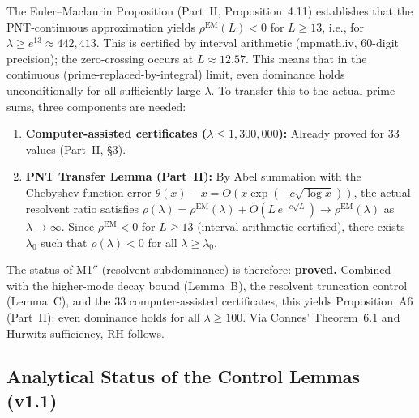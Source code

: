 \documentclass[12pt,a4paper]{article}
\theoremstyle{definition}
\theoremstyle{remark}
\begin{document}
The Euler--Maclaurin Proposition (Part~II, Proposition~4.11) establishes that the PNT-continuous approximation yields $\rho^{\mathrm{EM}}(L) < 0$ for $L \geq 13$, i.e., for $\lambda \geq e^{13} \approx 442{,}413$. This is certified by interval arithmetic (mpmath.iv, 60-digit precision); the zero-crossing occurs at $L \approx 12.57$. This means that in the continuous (prime-replaced-by-integral) limit, even dominance holds unconditionally for all sufficiently large $\lambda$. To transfer this to the actual prime sums, three components are needed:

\begin{enumerate}
  \item \textbf{Computer-assisted certificates ($\lambda \leq 1{,}300{,}000$):} Already proved for $33$ values (Part~II, \S3).
  \item \textbf{PNT Transfer Lemma (Part~II):} By Abel summation with the Chebyshev function error $\theta(x) - x = O(x\exp(-c\sqrt{\log x}))$, the actual resolvent ratio satisfies $\rho(\lambda) = \rho^{\mathrm{EM}}(\lambda) + O(L\,e^{-c\sqrt{L}}) \to \rho^{\mathrm{EM}}(\lambda)$ as $\lambda \to \infty$. Since $\rho^{\mathrm{EM}} < 0$ for $L \geq 13$ (interval-arithmetic certified), there exists $\lambda_0$ such that $\rho(\lambda) < 0$ for all $\lambda \geq \lambda_0$.
\end{enumerate}

\noindent The status of M1$''$ (resolvent subdominance) is therefore: \textbf{proved.} Combined with the higher-mode decay bound (Lemma~B), the resolvent truncation control (Lemma~C), and the $33$ computer-assisted certificates, this yields Proposition~A6 (Part~II): even dominance holds for all $\lambda \geq 100$. Via Connes' Theorem~6.1 and Hurwitz sufficiency, RH follows.

\subsection{Analytical Status of the Control Lemmas (v1.1)}
\end{document}

